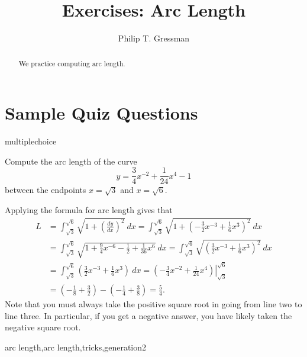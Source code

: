 \documentclass{ximera}
\title{Exercises: Arc Length}
\author{Philip T. Gressman}
\begin{document}
\begin{abstract}
We practice computing arc length.
\end{abstract}
\maketitle


\section*{Sample Quiz Questions}

\begin{question}[Arclen01]
\begin{type}
multiplechoice
\end{type}
Compute the arc length of the curve \[y = \frac{3}{4}x^{-2} + \frac{1}{24}x^{4} - 1\] between the endpoints \(x = \sqrt{3}\) and \(x = \sqrt{6}\).
\begin{multiplechoice}
\end{multiplechoice}
\begin{feedback}
Applying the formula for arc length gives that
\[
\begin{aligned}
L & = \int_{\sqrt{3}}^{\sqrt{6}} \sqrt{1 + \left( \frac{dy}{dx} \right)^2}~dx 
   = \int_{\sqrt{3}}^{\sqrt{6}} \sqrt{1 + \left( -\frac{3}{2}x^{-3} + \frac{1}{6}x^{3} \right)^2}~dx \\
  & = \int_{\sqrt{3}}^{\sqrt{6}} \sqrt{1 + \frac{9}{4}x^{-6} - \frac{1}{2} + \frac{1}{36}x^{6}} ~ dx 
   = \int_{\sqrt{3}}^{\sqrt{6}} \sqrt{ \left( \frac{3}{2}x^{-3} + \frac{1}{6}x^{3} \right)^2} ~ dx \\
  & = \int_{\sqrt{3}}^{\sqrt{6}} \left( \frac{3}{2}x^{-3} + \frac{1}{6}x^{3} \right) ~ dx 
   = \left.  \left( -\frac{3}{4}x^{-2} + \frac{1}{24}x^{4} \right) \right|_{\sqrt{3}}^{\sqrt{6}} \\
  & =  \left( -\frac{1}{8} + \frac{3}{2} \right) - \left( -\frac{1}{4} + \frac{3}{8} \right) 
   = \frac{5}{4}.
\end{aligned}
\]
Note that you must always take the positive square root in going from line two to line three. In particular, if you get a negative answer, you have likely taken the negative square root.
\end{feedback}
\begin{keywords}
arc length,arc length,tricks,generation2
\end{keywords}
\end{question}
\end{document}
